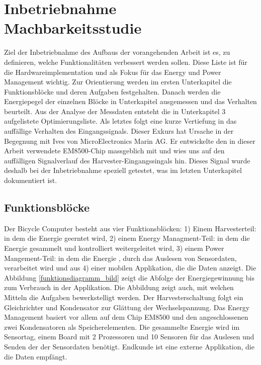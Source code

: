  
 
 
 
 
 
\section{Inbetriebnahme Machbarkeitsstudie}\label{v_inbetriebnahme} 
      
Ziel der Inbetriebnahme des Aufbaus der vorangehenden Arbeit \cite{PA_bicycle} ist es, zu definieren, welche Funktionalitäten verbessert werden sollen. Diese Liste ist für die Hardwareimplementation und als Fokus für das Energy und Power Management wichtig. Zur Orientierung werden im ersten Unterkapitel die Funktionsblöcke und deren Aufgaben festgehalten. Danach werden die Energiepegel der einzelnen Blöcke in Unterkapitel ausgemessen und das Verhalten beurteilt. Aus der Analyse der Messdaten entsteht die in Unterkapitel 3 aufgelistete Optimierungsliste. Als letztes folgt eine kurze Vertiefung in das auffällige Verhalten des Eingangssignals. Dieser Exkurs hat Ursache in der Begegnung mit  Ives  von MicroElectronics Marin AG. Er entwickelte den in dieser Arbeit verwendete EM8500-Chip massgeblich mit und wies uns auf den auffälligen Signalverlauf des Harvester-Eingangssingals hin. Dieses Signal wurde deshalb bei der Inbetriebnahme speziell getestet, was im letzten Unterkapitel dokumentiert ist.
      
\subsection{Funktionsblöcke}

Der Bicycle Computer besteht aus vier Funktionsblöcken: 1) Einem Harvesterteil: in dem die Energie geerntet wird, 2) einem Energy Managment-Teil: in dem die Energie gesammelt und kontrolliert weitergeleitet wird, 3) einem Power Mangement-Teil: in dem die Energie , durch das Auslesen von Sensordaten, verarbeitet wird und aus 4) einer mobilen Applikation, die die Daten anzeigt. Die Abbildung \ref{funktionsdiagramm_bild} zeigt die Abfolge der Energiegewinnung bis zum Verbrauch in der Applikation. Die Abbildung zeigt auch, mit welchen Mitteln die Aufgaben bewerkstelligt werden. Der Harvesterschaltung folgt ein Gleichrichter und Kondensator zur Glättung der Wechselspannung. Das Energy Management basiert vor allem auf dem Chip EM8500 und den angeschlossenen zwei Kondensatoren als Speicherelementen. Die gesammelte Energie wird im Sensortag, einem Board mit 2 Prozessoren und 10 Sensoren für das Auslesen und Senden der der Sensordaten benötigt. Endkunde ist eine externe Applikation, die die Daten empfängt.

